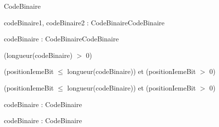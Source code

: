 \begin{algorithme}

    {}{CodeBinaire}

    {codeBinaire1, codeBinaire2 : CodeBinaire}{CodeBinaire}

    {}
    {}

    {codeBinaire : CodeBinaire}{CodeBinaire}

    {}
    {(longueur(codeBinaire) $>$ 0)}

    {}

    {}
    {}
    {(positionIemeBit $\leq$ longueur(codeBinaire)) et (positionIemeBit $>$ 0)}

    {}
    {}
    {(positionIemeBit $\leq$ longueur(codeBinaire)) et (positionIemeBit $>$ 0)}

    {codeBinaire : CodeBinaire}{\naturelNonNul}

    {codeBinaire : CodeBinaire}{\booleen}

\end{algorithme}